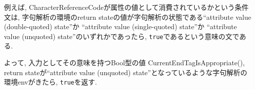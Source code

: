 \documentclass[uplatex,a4j]{jsreport}
\begin{document}
例えば, 
CharacterReferenceCodeが属性の値として消費されているかという条件文は, 
字句解析の環境のreturn stateの値が字句解析の状態である``attribute value (double-quoted) state''か 
``attribute value (single-quoted) state''か ``attribute value (unquoted) state''のいずれかであったら, 
\texttt{true}であるという意味の文である. 

よって, 入力としてその意味を持つBool型の値 CurrentEndTagIsAppropriate(), return stateが``attribute value (unquoted) state''となっているような字句解析の環境envがきたら, 
\texttt{true}を返す. 




\end{document}
